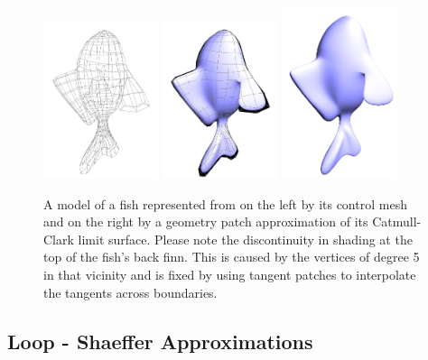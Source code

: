 \documentclass[12pt, letterpaper]{article}
\begin{document}
		\begin{figure}[h]
		\centering
		\includegraphics[width=0.3\textwidth]{fish_cm}
		\includegraphics[width=0.3\textwidth]{fish_cm_and_patch}
		\includegraphics[width=0.3\textwidth]{fish_patch}
		\caption{A model of a fish represented from on the left by its control mesh and on the right by a geometry patch approximation of its Catmull-Clark limit surface. Please note the discontinuity in shading at the top of the fish's back finn. This is caused by the vertices of degree 5 in that vicinity and is fixed by using tangent patches to interpolate the tangents across boundaries.}
		\label{fig:subDDef}
		\end{figure}


	\subsection{Loop - Shaeffer Approximations}
	
\end{document}

